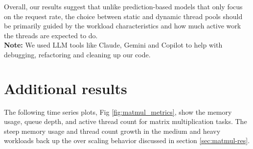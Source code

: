 \documentclass[sigconf, 10pt]{acmart}
\begin{document}
Overall, our results suggest that unlike prediction-based models that only focus on the request rate,
the choice between static and dynamic thread pools should be primarily guided by the workload characteristics and how much active work the threads are expected to do.\\

\noindent\textbf{Note:} We used LLM tools like Claude, Gemini and Copilot to help with debugging, refactoring and cleaning up our code.








\appendix
\section{Additional results}
The following time series plots, Fig \ref{fig:matmul_metrics}, show the memory usage, queue depth, and active thread count for matrix multiplication tasks.
The steep memory usage and thread count growth in the medium and heavy workloads back up the over scaling behavior discussed in section \ref{sec:matmul-res}.
\end{document}
